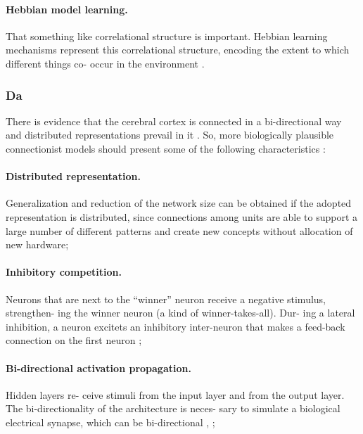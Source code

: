 \paragraph{Hebbian model learning.} That something like correlational structure is important.
Hebbian learning mechanisms represent this correlational
structure, encoding the extent to which different things co-
occur in the environment \citet{hinton1988learning}.

\subsubsection{Da} 

\citet{da2011advances} 

There is evidence that the cerebral cortex is connected in a
bi-directional way and distributed representations prevail in
it \citet{o2000computational}. So, more biologically plausible connectionist models
should present some of the following characteristics \citet{orru2008sabio}:

\paragraph{Distributed representation.} Generalization and reduction
of the network size can be obtained if the adopted
representation is distributed, since connections among
units are able to support a large number of different
patterns and create new concepts without allocation of
new hardware;

\paragraph{Inhibitory competition.} Neurons that are next to the
“winner” neuron receive a negative stimulus, strengthen-
ing the winner neuron (a kind of winner-takes-all). Dur-
ing a lateral inhibition, a neuron excitets an inhibitory
inter-neuron that makes a feed-back connection on the
first neuron \citet{o1998six};

\paragraph{Bi-directional activation propagation.} Hidden layers re-
ceive stimuli from the input layer and from the output
layer. The bi-directionality of the architecture is neces-
sary to simulate a biological electrical synapse, which
can be bi-directional \citet{kandel1995essentials}, \citet{rosa2002biologically};

